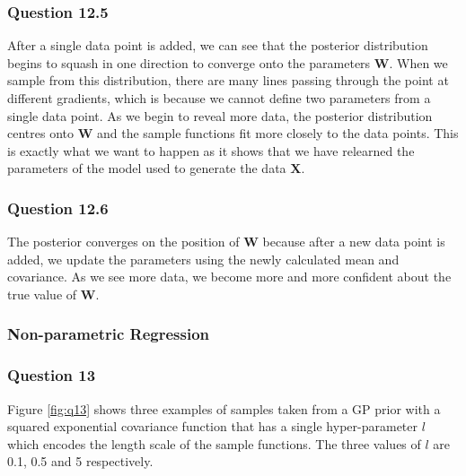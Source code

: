 \documentclass[10pt, a4paper, twocolumn]{article} %
\begin{document}
\subsubsection*{Question 12.5}
After a single data point is added, we can see that the posterior distribution begins to squash in one direction to converge onto the parameters $\mathbf{W}$. When we sample from this distribution, there are many lines passing through the point at different gradients, which is because we cannot define two parameters from a single data point. As we begin to reveal more data, the posterior distribution centres onto $\mathbf{W}$ and the sample functions fit more closely to the data points. This is exactly what we want to happen as it shows that we have relearned the parameters of the model used to generate the data $\mathbf{X}$.

\subsubsection*{Question 12.6}
The posterior converges on the position of $\mathbf{W}$ because after a new data point is added, we update the parameters using the newly calculated mean and covariance. As we see more data, we become more and more confident about the true value of $\mathbf{W}$.


\subsubsection{Non-parametric Regression}
\subsubsection*{Question 13}

Figure \ref{fig:q13} shows three examples of samples taken from a GP prior with a squared exponential covariance function that has a single hyper-parameter $l$ which encodes the length scale of the sample functions. The three values of $l$ are 0.1, 0.5 and 5 respectively.
\end{document}
